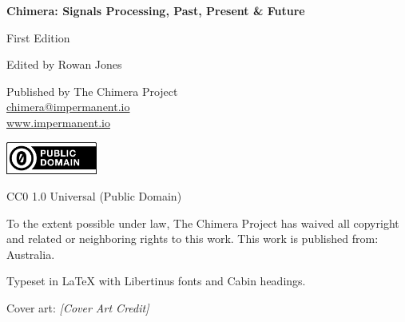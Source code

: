 \documentclass[12pt,a4paper,oneside]{book}
\begin{document}
\newpage
\thispagestyle{empty}
\vspace*{\fill}
\begin{center}

{\Large\bfseries Chimera: Signals Processing, Past, Present \& Future}

\vspace{1cm}

{\large First Edition}

\vspace{0.5cm}

{\large Edited by Rowan Jones}

\vspace{1cm}

Published by The Chimera Project\\
\href{mailto:chimera@impermanent.io}{chimera@impermanent.io}\\
\url{www.impermanent.io}

\vspace{1cm}

\includegraphics[width=3cm]{graphics/cc-zero.png}

\vspace{0.5cm}

{\large CC0 1.0 Universal (Public Domain)}

\vspace{0.5cm}

To the extent possible under law, The Chimera Project has waived all copyright and related or neighboring rights to this work. This work is published from: Australia.

\vspace{1cm}

{\small Typeset in \LaTeX{} with Libertinus fonts and Cabin headings.}

\vspace{0.5cm}

{\small Cover art: \textit{[Cover Art Credit]}}

\end{center}
\vspace*{\fill}
\newpage





\tableofcontents
\newpage
\end{document}
